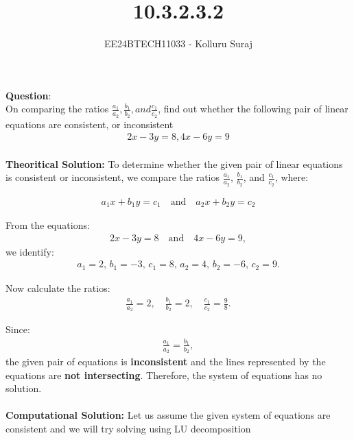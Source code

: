 \documentclass[journal]{IEEEtran}
\begin{document}

\vspace{3cm}

\title{10.3.2.3.2}
\author{EE24BTECH11033 - Kolluru Suraj}
 \maketitle
{\let\newpage\relax\maketitle}

\renewcommand{\thefigure}{\theenumi}
\renewcommand{\thetable}{\theenumi}
\setlength{\intextsep}{10pt} %


\renewcommand{\thetable}{\theenumi}


\textbf{Question}:\\
On comparing the ratios $\frac{a_1}{a_2},\frac{b_1}{b_2},and \frac{c_1}{c_2}$, find out whether the following pair of linear equations are consistent, or inconsistent
\begin{align}
    2x-3y=8, 4x-6y=9
\end{align}
\\


\textbf{Theoritical Solution:}
To determine whether the given pair of linear equations is consistent or inconsistent, we compare the ratios $\frac{a_1}{a_2}$, $\frac{b_1}{b_2}$, and $\frac{c_1}{c_2}$, where:
	
	\begin{align}
		a_1x + b_1y = c_1 \quad \text{and} \quad a_2x + b_2y = c_2
	\end{align}
	
	From the equations:
	\begin{align}
		2x - 3y = 8 \quad \text{and} \quad 4x - 6y = 9,
	\end{align}
	we identify:
	\begin{align}
		a_1 = 2, \, b_1 = -3, \, c_1 = 8, \, a_2 = 4, \, b_2 = -6, \, c_2 = 9.
	\end{align}
	
	Now calculate the ratios:
	\begin{align}
		\frac{a_1}{a_2} = 2, \quad \frac{b_1}{b_2} = 2, \quad \frac{c_1}{c_2} = \frac{9}{8}.
	\end{align}
	
	Since:
	\begin{align}
		\frac{a_1}{a_2} = \frac{b_1}{b_2},
	\end{align}
	the given pair of equations is \textbf{inconsistent} and the lines represented by the equations are \textbf{not intersecting}. Therefore, the system of equations has no solution.\\\\
	\textbf{Computational Solution:}
	\newline
	Let us assume the given system of equations are consistent and we will try solving using LU decomposition
	
\end{document}
